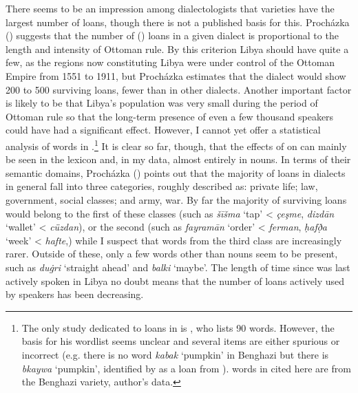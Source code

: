\documentclass[output=paper]{langsci/langscibook}
\begin{document}
  There seems to be an impression among dialectologists that  varieties have the largest number of  loans, though there is not a published basis for this. Procházka (\citeyear[191]{Procházka2005}) suggests that the number of ()  loans in a given  dialect is proportional to the length and intensity of Ottoman rule. By this criterion Libya should have quite a few, as the regions now constituting Libya were under control of the Ottoman Empire from 1551 to 1911, but Procházka estimates that the dialect would show 200 to 500 surviving loans, fewer than in other dialects. Another important factor is likely to be that Libya’s population was very small during the period of Ottoman rule so that the long-term presence of even a few thousand  speakers could have had a significant effect. However, I cannot yet offer a statistical analysis of  words in .\footnote{The only study dedicated to  loans in  is \citet{Türkmen1988}, who lists 90 words. However, the basis for his wordlist seems unclear and  several items are either spurious or incorrect (e.g. there is no word \textit{kabak} ‘pumpkin’ in Benghazi  but there is \textit{bkaywa} ‘pumpkin’, identified by \citet{Souag2013lexical} as a loan from ).  words in  cited here are from the Benghazi variety, author’s data.} It is clear so far, though, that the effects of  on  can mainly be seen in the lexicon and, in my data, almost entirely in nouns. In terms of their semantic domains, Procházka (\citeyear[192]{Procházka2005}) points out that the majority of  loans in  dialects in general fall into three categories, roughly described as: private life; law, government, social classes; and army, war. By far the majority of surviving loans would belong to the first of these classes (such as \textit{šīšma} ‘tap’ < \textit{çeşme}, \textit{dizdān} ‘wallet’ < \textit{cüzdan}), or the second (such as \textit{fayramān} ‘order’ < \textit{ferman}, \textit{ḥafð̣a} ‘week’ < \textit{hafte},) while I suspect that words from the third class are increasingly rarer. Outside of these, only a few words other than nouns seem to be present, such as \textit{du\.gri} ‘straight ahead’ and \textit{balki} ‘maybe’. The length of time since  was last actively spoken in Libya no doubt means that the number of  loans actively used by speakers has been decreasing.
\end{document}
